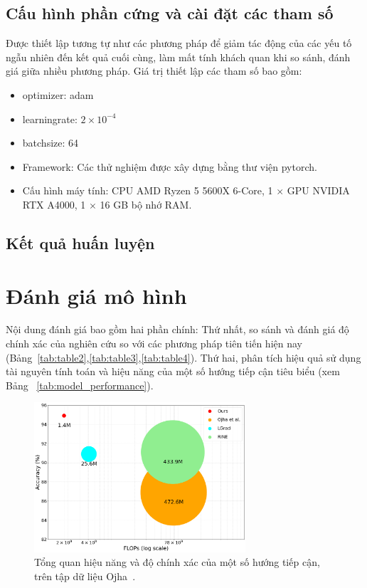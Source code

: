 \subsection{Cấu hình phần cứng và cài đặt các tham số} Được thiết lập tương tự như các phương pháp \cite{Wang2019CNNGeneratedIA, Tan2023RethinkingTU,Tan2023LearningOG} để giảm tác động của các yếu tố ngẫu nhiên đến kết quả cuối cùng, làm mất tính khách quan khi so sánh, đánh giá giữa nhiều phương pháp. Giá trị thiết lập các tham số bao gồm:
	\begin{itemize}
		\item \Gls{optimizer}: \Gls{adam}
		\item \Gls{learningrate}: $2 \times 10^{-4}$
		\item \Gls{batchsize}: 64
		\item Framework: Các thử nghiệm được xây dựng bằng thư viện \Gls{pytorch}.
		\item Cấu hình máy tính: CPU AMD Ryzen 5 5600X 6-Core, 1 $\times$ GPU NVIDIA RTX A4000, 1 $\times$ 16 GB bộ nhớ RAM.
	\end{itemize}

\subsection{Kết quả huấn luyện}



\section{Đánh giá mô hình}
%
Nội dung đánh giá bao gồm hai phần chính: Thứ nhất, so sánh và đánh giá độ chính xác của nghiên cứu so với các phương pháp tiên tiến hiện nay (Bảng~\ref{tab:table2},\ref{tab:table3},\ref{tab:table4}). Thứ hai, phân tích hiệu quả sử dụng tài nguyên tính toán và hiệu năng của một số hướng tiếp cận tiêu biểu (xem Bảng ~\ref{tab:model_performance}).
%
%
%
\begin{figure}[h!]
	\centering
	\includegraphics[width=0.7\textwidth]{Images/tease.png}
	\caption{Tổng quan hiệu năng và độ chính xác của một số hướng tiếp cận, trên tập dữ liệu Ojha~\cite{Ojha2023TowardsUF}.}
	\label{fig:teaser}
\end{figure}
